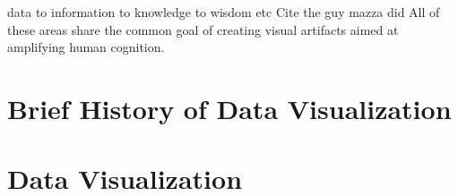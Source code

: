 \documentclass[a4paper, 10pt, titlepage]{article}
\begin{document}
data to information to knowledge to wisdom etc Cite the guy mazza did
All of these areas share the common goal of creating visual artifacts aimed at amplifying human cognition.


\section{Brief History of Data Visualization}

\section{}

\section{Data Visualization}

\newpage


 


 
\end{document}
